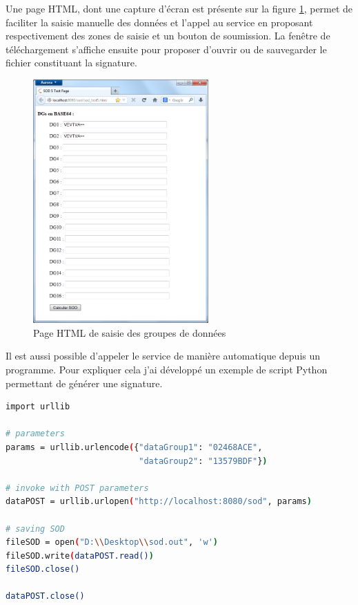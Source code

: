Une page HTML, dont une capture d'écran est présente sur la figure \ref{saisie_DGs}, permet de faciliter la saisie manuelle des données et l'appel au service en proposant respectivement des zones de saisie et un bouton de soumission.
La fenêtre de téléchargement s'affiche ensuite pour proposer d'ouvrir ou de sauvegarder le fichier constituant la signature.
\begin{figure}[!h]
	\center
	\includegraphics[width=0.6\textwidth]{img/saisie_DGs.png}
	\caption{Page HTML de saisie des groupes de données}
	\label{saisie_DGs}
\end{figure}

Il est aussi possible d'appeler le service de manière automatique depuis un programme.
Pour expliquer cela j'ai développé un exemple de script Python permettant de générer une signature.
\begin{lstlisting}[language = sh]
import urllib

# parameters
params = urllib.urlencode({"dataGroup1": "02468ACE",
                           "dataGroup2": "13579BDF"})

# invoke with POST parameters
dataPOST = urllib.urlopen("http://localhost:8080/sod", params)

# saving SOD
fileSOD = open("D:\\Desktop\\sod.out", 'w')
fileSOD.write(dataPOST.read())
fileSOD.close()

dataPOST.close()
\end{lstlisting}